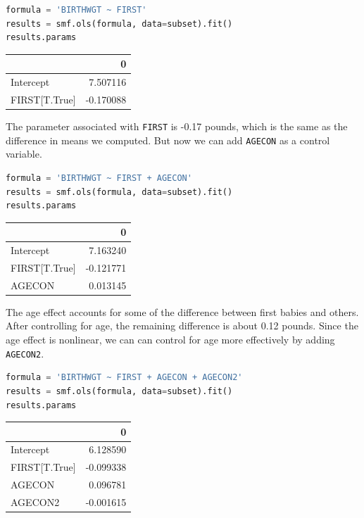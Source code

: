 \begin{lstlisting}[language=Python,style=source]
formula = 'BIRTHWGT ~ FIRST'
results = smf.ols(formula, data=subset).fit()
results.params
\end{lstlisting}

\begin{tabular}{lr}
\toprule
{} &         0 \\
\midrule
Intercept     &  7.507116 \\
FIRST[T.True] & -0.170088 \\
\bottomrule
\end{tabular}

The parameter associated with \passthrough{\lstinline!FIRST!} is -0.17
pounds, which is the same as the difference in means we computed. But
now we can add \passthrough{\lstinline!AGECON!} as a control variable.

\begin{lstlisting}[language=Python,style=source]
formula = 'BIRTHWGT ~ FIRST + AGECON'
results = smf.ols(formula, data=subset).fit()
results.params
\end{lstlisting}

\begin{tabular}{lr}
\toprule
{} &         0 \\
\midrule
Intercept     &  7.163240 \\
FIRST[T.True] & -0.121771 \\
AGECON        &  0.013145 \\
\bottomrule
\end{tabular}

The age effect accounts for some of the difference between first babies
and others. After controlling for age, the remaining difference is about
0.12 pounds. Since the age effect is nonlinear, we can can control for
age more effectively by adding \passthrough{\lstinline!AGECON2!}.

\begin{lstlisting}[language=Python,style=source]
formula = 'BIRTHWGT ~ FIRST + AGECON + AGECON2'
results = smf.ols(formula, data=subset).fit()
results.params
\end{lstlisting}

\begin{tabular}{lr}
\toprule
{} &         0 \\
\midrule
Intercept     &  6.128590 \\
FIRST[T.True] & -0.099338 \\
AGECON        &  0.096781 \\
AGECON2       & -0.001615 \\
\bottomrule
\end{tabular}

